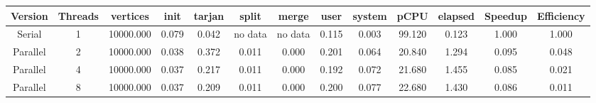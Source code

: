 \begin{tabular}{|c|c|c|c|c|c|c|c|c|c|c|c|c|}
\toprule
 Version &  Threads &  vertices &  init &  tarjan &   split &   merge &  user &  system &   pCPU &  elapsed &  Speedup &  Efficiency \\
\midrule
  Serial &        1 & 10000.000 & 0.079 &   0.042 & no data & no data & 0.115 &   0.003 & 99.120 &    0.123 &    1.000 &       1.000 \\
Parallel &        2 & 10000.000 & 0.038 &   0.372 &   0.011 &   0.000 & 0.201 &   0.064 & 20.840 &    1.294 &    0.095 &       0.048 \\
Parallel &        4 & 10000.000 & 0.037 &   0.217 &   0.011 &   0.000 & 0.192 &   0.072 & 21.680 &    1.455 &    0.085 &       0.021 \\
Parallel &        8 & 10000.000 & 0.037 &   0.209 &   0.011 &   0.000 & 0.200 &   0.077 & 22.680 &    1.430 &    0.086 &       0.011 \\
\bottomrule
\end{tabular}
